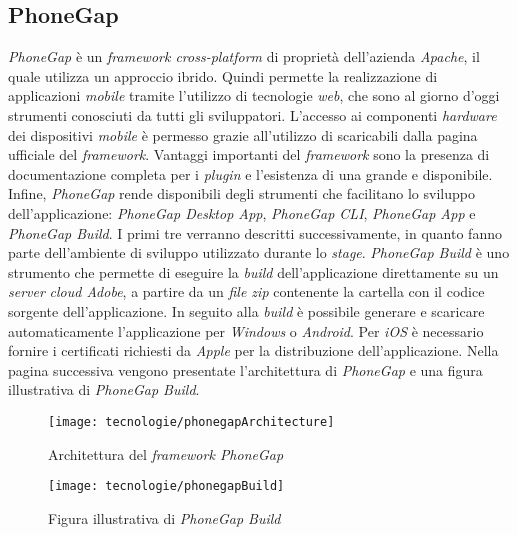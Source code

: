 \subsection{PhoneGap}

\textit{PhoneGap} è un \textit{framework cross-platform} di proprietà dell'azienda \textit{Apache}, il quale utilizza un approccio ibrido. Quindi permette la realizzazione di applicazioni \textit{mobile} tramite l'utilizzo di tecnologie \textit{web}, che sono al giorno d'oggi strumenti conosciuti da tutti gli sviluppatori. L'accesso ai componenti \textit{hardware} dei dispositivi \textit{mobile} è permesso grazie all'utilizzo di  scaricabili dalla pagina ufficiale del \textit{framework}. Vantaggi importanti del \textit{framework} sono la presenza di documentazione completa per i \textit{plugin} e l'esistenza di una  grande e disponibile. Infine, \textit{PhoneGap} rende disponibili degli strumenti che facilitano lo sviluppo dell'applicazione: \textit{PhoneGap Desktop App}, \textit{PhoneGap CLI}, \textit{PhoneGap App} e \textit{PhoneGap Build}. I primi tre verranno descritti successivamente, in quanto fanno parte dell'ambiente di sviluppo utilizzato durante lo \textit{stage}. \textit{PhoneGap Build} è uno strumento che permette di eseguire la \textit{build} dell'applicazione direttamente su un \textit{server} \textit{cloud Adobe}, a partire da un \textit{file zip} contenente la cartella con il codice sorgente dell'applicazione. In seguito alla \textit{build} è possibile generare e scaricare automaticamente l'applicazione per \textit{Windows} o \textit{Android}. Per \textit{iOS} è necessario fornire i certificati richiesti da \textit{Apple} per la distribuzione dell'applicazione. Nella pagina successiva vengono presentate l'architettura di \textit{PhoneGap} e una figura illustrativa di \textit{PhoneGap Build}.

\begin{figure}[!h] 
    \centering 
    \texttt{[image: tecnologie/phonegapArchitecture]} 
    \caption{Architettura del \textit{framework PhoneGap}}
\end{figure}

\begin{figure}[!h] 
    \centering 
    \texttt{[image: tecnologie/phonegapBuild]} 
    \caption{Figura illustrativa di \textit{PhoneGap Build}}
\end{figure}

\newpage


